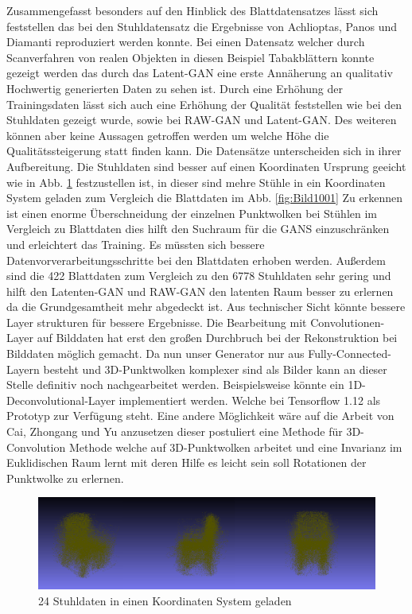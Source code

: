 \documentclass{llncs}
\begin{document}
Zusammengefasst besonders auf den Hinblick des Blattdatensatzes lässt sich feststellen das bei den Stuhldatensatz die Ergebnisse von Achlioptas, Panos und Diamanti\cite{3dgan} reproduziert werden konnte. Bei einen Datensatz welcher durch Scanverfahren von realen Objekten in diesen Beispiel Tabakblättern konnte gezeigt werden das durch das Latent-GAN eine erste Annäherung an qualitativ Hochwertig generierten Daten zu sehen ist. Durch eine Erhöhung der Trainingsdaten lässt sich auch eine Erhöhung der Qualität feststellen wie bei den Stuhldaten gezeigt wurde, sowie bei RAW-GAN und Latent-GAN. Des weiteren können aber keine Aussagen getroffen werden um welche Höhe die Qualitätssteigerung statt  finden kann. Die Datensätze unterscheiden sich in ihrer Aufbereitung. Die Stuhldaten sind besser auf einen Koordinaten Ursprung geeicht wie in Abb. \ref{fig:Bild85} festzustellen ist, in dieser sind mehre Stühle in ein Koordinaten System geladen zum Vergleich die Blattdaten im Abb. \ref{fig:Bild1001} Zu erkennen ist einen enorme Überschneidung der einzelnen Punktwolken bei Stühlen im Vergleich zu Blattdaten dies hilft den Suchraum für die GANS einzuschränken und erleichtert das Training. Es müssten sich bessere Datenvorverarbeitungsschritte bei den Blattdaten erhoben werden. Außerdem sind die 422 Blattdaten zum Vergleich zu den 6778 Stuhldaten sehr gering und hilft den Latenten-GAN und RAW-GAN den latenten Raum besser zu erlernen da die Grundgesamtheit mehr abgedeckt ist. Aus technischer Sicht könnte bessere Layer strukturen für bessere Ergebnisse. Die Bearbeitung mit Convolutionen-Layer auf Bilddaten hat erst den großen Durchbruch bei der Rekonstruktion bei Bilddaten möglich gemacht\cite{imagerecon}. Da nun unser Generator nur aus Fully-Connected-Layern besteht und 3D-Punktwolken komplexer sind als Bilder kann an dieser Stelle definitiv noch nachgearbeitet werden. Beispielsweise könnte ein 1D-Deconvolutional-Layer implementiert werden. Welche bei Tensorflow 1.12 als Prototyp zur Verfügung steht. Eine andere Möglichkeit wäre auf die Arbeit von Cai, Zhongang  und Yu \cite{3d-conv} anzusetzen dieser postuliert eine Methode für 3D-Convolution Methode welche auf 3D-Punktwolken arbeitet und eine Invarianz im Euklidischen Raum lernt mit deren Hilfe es leicht sein soll Rotationen der Punktwolke zu erlernen.
\begin{figure}[htbp] 
	\centering
	\includegraphics[width=1.0\textwidth]{chair_all.png}
	\caption{24 Stuhldaten in einen Koordinaten System geladen}
	\label{fig:Bild85}
\end{figure}
\newpage
\end{document}
